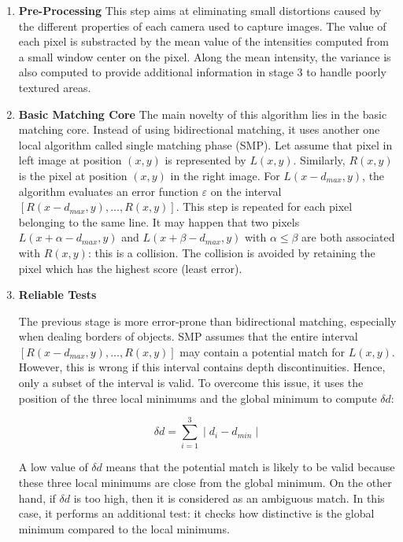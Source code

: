 \documentclass[12pt]{article}
\begin{document}
\begin{enumerate}
  \item \textbf{Pre-Processing} This step aims at eliminating small distortions caused by the different properties of each camera used to capture images. The value of each pixel is substracted by the mean value of the intensities computed from a small window center on the pixel. Along the mean intensity, the variance is also computed to provide additional information in stage 3 to handle poorly textured areas.

  \item \textbf{Basic Matching Core}
The main novelty of this algorithm lies in the basic matching core. Instead of using bidirectional matching, it uses another one local algorithm called single matching phase (SMP). Let assume that pixel in left image at position $(x, y)$ is represented by $L(x, y)$. Similarly, $R(x, y)$ is the pixel at position $(x, y)$ in the right image. For $L(x-d_{max}, y)$, the algorithm evaluates an error function $\varepsilon$ on the interval $[R(x-d_{max}, y), \hdots, R(x,y)]$. This step is repeated for each pixel belonging to the same line. It may happen that two pixels $L(x+\alpha - d_{max}, y)$ and $L(x+\beta - d_{max}, y)$ with $\alpha \leq \beta$ are both associated with $R(x, y)$: this is a collision. The collision is avoided by retaining the pixel which has the highest score (least error).

  \item \textbf{Reliable Tests}

The previous stage is more error-prone than bidirectional matching, especially when dealing borders of objects. SMP assumes that the entire interval $[R(x-d_{max}, y), \hdots, R(x,y)]$ may contain a potential match for $L(x, y)$. However, this is wrong if this interval contains depth discontinuities. Hence, only a subset of the interval is valid. To overcome this issue, it uses the position of the three local minimums and the global minimum to compute $\delta d$:

\begin{equation}
  \delta d = \sum_{i=1}^{3} \mid d_i - d_{min} \mid 
\end{equation}

A low value of $\delta d$ means that the potential match is likely to be valid because these three local minimums are close from the global minimum. On the other hand, if $\delta d$ is too high, then it is considered as an ambiguous match. In this case, it performs an additional test: it checks how distinctive is the global minimum compared to the local minimums.


\end{enumerate}
\end{document}
